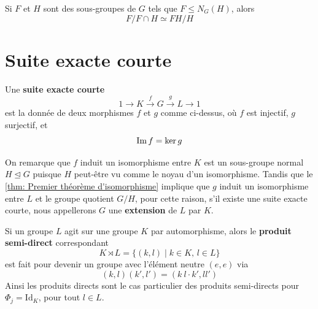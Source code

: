 \begin{theoreme}
	Si $F$ et $H$ sont des sous-groupes de $G$ tels que $F \leq N_G(H)$, alors
	\[
	F /F \cap H \simeq FH/ H
	\]
\end{theoreme}

\begin{figure}[H]
	\centering
\end{figure}

\section{Suite exacte courte}

\begin{definition}
	Une \textbf{suite exacte courte}
	\[
	1 \to K \overset{f}{\to} G \overset{g}{\to} L \to 1
	\]
	est la donnée de deux morphismes $f$ et $g$ comme ci-dessus, où $f$ est injectif, $g$ surjectif, et
	\[
	\operatorname{Im} f = \ker g
	\]
\end{definition}

\begin{remarque}
	On remarque que $f$ induit un isomorphisme entre $K$ est un sous-groupe normal $H \trianglelefteq G$ puisque $H$ peut-être vu comme le noyau d'un isomorphisme. Tandis que le \autoref{thm: Premier théorème d'isomorphisme} implique que $g$ induit un isomorphisme entre $L$ et le groupe quotient $G/H$, pour cette raison, s'il existe une suite exacte courte, nous appellerons $G$ une \textbf{extension} de $L$ par $K$.
\end{remarque}

\begin{definition}
	Si un groupe $L$ agit sur une groupe $K$ par automorphisme, alors le \textbf{produit semi-direct} correspondant
	\[
	K \rtimes L = \{(k,l) \mid k \in K, \, l \in L\}
	\]
	est fait pour devenir un groupe avec l'élément neutre $(e,e)$ via
	\[
	(k,l)(k',l') = (k ~ l \cdot k', ll')
	\]
	Ainsi les produits directs sont le cas particulier des produits semi-directs pour $\Phi_j = \mathrm{Id}_K$, pour tout $l \in L$.
\end{definition}

